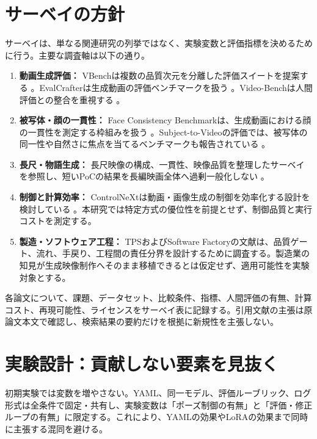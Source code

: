 \documentclass[11pt,a4paper]{article}
\begin{document}
\section{サーベイの方針}
サーベイは、単なる関連研究の列挙ではなく、実験変数と評価指標を決めるために行う。主要な調査軸は以下の通り。
\begin{enumerate}[nosep]
\item \textbf{動画生成評価：} VBenchは複数の品質次元を分離した評価スイートを提案する \cite{huang2024vbench}。EvalCrafterは生成動画の評価ベンチマークを扱う \cite{liu2024evalcrafter}。Video-Benchは人間評価との整合を重視する \cite{han2025videobench}。
\item \textbf{被写体・顔の一貫性：} Face Consistency Benchmarkは、生成動画における顔の一貫性を測定する枠組みを扱う \cite{podstawski2025fcb}。Subject-to-Videoの評価では、被写体の同一性や自然さに焦点を当てるベンチマークも報告されている \cite{yuan2025opens2v}。
\item \textbf{長尺・物語生成：} 長尺映像の構成、一貫性、映像品質を整理したサーベイを参照し、短いPoCの結果を長編映画全体へ過剰一般化しない \cite{elmoghany2025longvid}。
\item \textbf{制御と計算効率：} ControlNeXtは動画・画像生成の制御を効率化する設計を検討している \cite{peng2024controlnext}。本研究では特定方式の優位性を前提とせず、制御品質と実行コストを測定する。
\item \textbf{製造・ソフトウェア工程：} TPSおよびSoftware Factoryの文献は、品質ゲート、流れ、手戻り、工程間の責任分界を設計するために調査する。製造業の知見が生成映像制作へそのまま移植できるとは仮定せず、適用可能性を実験対象とする。
\end{enumerate}
各論文について、課題、データセット、比較条件、指標、人間評価の有無、計算コスト、再現可能性、ライセンスをサーベイ表に記録する。引用文献の主張は原論文本文で確認し、検索結果の要約だけを根拠に新規性を主張しない。

\section{実験設計：貢献しない要素を見抜く}
初期実験では変数を増やさない。YAML、同一モデル、評価ルーブリック、ログ形式は全条件で固定・共有し、実験変数は「ポーズ制御の有無」と「評価・修正ループの有無」に限定する。これにより、YAMLの効果やLoRAの効果まで同時に主張する混同を避ける。
\end{document}
